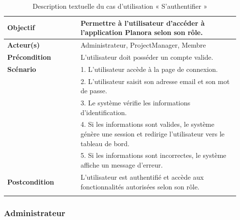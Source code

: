 \begin{longtable}[c]{|p{0.3\linewidth}|p{0.65\linewidth}|}
  \textbf{Objectif}      & Permettre à l'utilisateur d'accéder à l'application Planora selon son rôle.                                           \\
  \hline
  \textbf{Acteur(s)}     & Administrateur, ProjectManager, Membre                                                                                \\
  \hline
  \textbf{Précondition}  & L'utilisateur doit posséder un compte valide.                                                                         \\
  \hline
  \textbf{Scénario}      &
  1. L'utilisateur accède à la page de connexion.                                                                                                \\
                         & 2. L'utilisateur saisit son adresse email et son mot de passe.                                                        \\
                         & 3. Le système vérifie les informations d'identification.                                                              \\
                         & 4. Si les informations sont valides, le système génère une session et redirige l'utilisateur vers le tableau de bord. \\
                         & 5. Si les informations sont incorrectes, le système affiche un message d'erreur.                                      \\
  \hline
  \textbf{Postcondition} & L'utilisateur est authentifié et accède aux fonctionnalités autorisées selon son rôle.                                \\
  \hline
  \caption{\centering Description textuelle du cas d'utilisation « S'authentifier »}
\end{longtable}

\subsubsection{Administrateur}

